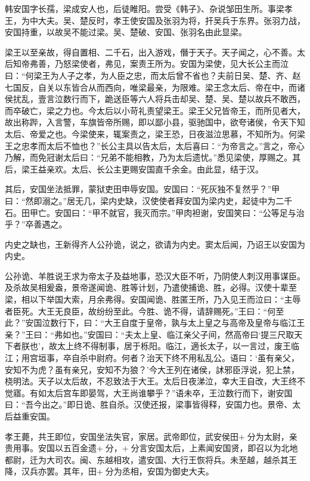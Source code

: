 \documentclass[12pt,UTF8]{ctexbook}
\begin{document}
韩安国字长孺，梁成安人也，后徒睢阳。尝受《韩子》、杂说邹田生所。事梁孝王，为中大夫。吴、楚反时，孝王使安国及张羽为将，扞吴兵于东界。张羽力战，安国持重，以故吴不能过梁。吴、楚破、安国、张羽名由此显梁。



梁王以至亲故，得自置相、二千石，出入游戏，僭于天子。天子闻之，心不善。太后知帝弗善，乃怒梁使者，弗见，案责王所为。安国为梁使，见大长公主而泣曰：“何梁王为人子之孝，为人臣之忠，而太后曾不省也？夫前日吴、楚、齐、赵七国反，自关以东皆合从而西向，唯梁最亲，为限难。梁王念太后、帝在中，而诸侯扰乱，壹言泣数行而下，跪送臣等六人将兵击却吴、楚、吴、楚以故兵不敢西，而卒破亡，梁之力也。今太后以小苛礼责望梁王。梁王父兄皆帝王，而所见者大，故出称跸，入言警，车旗皆帝所赐，即以鄙小县，驱驰国中，欲夸诸侯，令天下知太后、帝爱之也。今梁使来，辄案责之，梁王恐，日夜滋泣思慕，不知所为。何梁王之忠孝而太后不恤也？”长公主具以告太后，太后喜曰：“为帝言之。”言之，帝心乃解，而免冠谢太后曰：“兄弟不能相教，乃为太后遗忧。”悉见梁使，厚赐之。其后，梁王益亲欢。太后、长公主更赐安国直千余金。由此显，结于汉。



其后，安国坐法抵罪，蒙狱吏田申辱安国。安国曰：“死灰独不复然乎？”甲曰：“然即溺之。”居无几，梁内史缺，汉使使者拜安国为梁内史，起徒中为二千石。田甲亡。安国曰：“甲不就官，我灭而宗。”甲肉袒谢，安国笑曰：“公等足与治乎？”卒善遇之。



内史之缺也，王新得齐人公孙诡，说之，欲请为内史。窦太后闻，乃诏王以安国为内史。



公孙诡、羊胜说王求为帝太子及益地事，恐汉大臣不听，乃阴使人刺汉用事谋臣。及杀故吴相爰盎，景帝遂闻诡、胜等计划，乃遣使捕诡、胜，必得。汉使十辈至梁，相以下举国大索，月余弗得。安国闻诡、胜匿王所，乃入见王而泣曰：“主辱者臣死。大王无良臣，故纷纷至此。今胜、诡不得，请辞赐死。”王曰：“何至此？”安国泣数行下，曰：“大王自度于皇帝，孰与太上皇之与高帝及皇帝与临江王亲？”王曰：“弗如也。”安国曰：“夫太上皇、临江亲父子间，然高帝曰‘提三尺取天下者朕也’，故太上终不得制事，居于栎阳。临江，適长太子，以一言过，废王临江；用宫垣事，卒自杀中尉府。何者？治天下终不用私乱公。语曰：‘虽有亲父，安知不为虎？虽有亲兄，安知不为狼？’今大王列在诸侯，訹邪臣浮说，犯上禁，桡明法。天子以太后故，不忍致法于大王。太后日夜涕泣，幸大王自改，大王终不觉寤。有如太后宫车即晏驾，大王尚谁攀乎？”语未卒，王泣数行而下，谢安国曰：“吾今出之。”即日诡、胜自杀。汉使还报，梁事皆得释，安国力也。景帝、太后益重安国。



孝王薨，共王即位，安国坐法失官，家居。武帝即位，武安侯田+分为太尉，亲贵用事。安国以五百金遗+分，+分言安国太后，上素闻安国贤，即召以为北地都尉，迁为大司农。闽、东越相攻，遣安国、大行王恢将兵。未至越，越杀其王降，汉兵亦罢。其年，田+分为丞相，安国为御史大夫。
\end{document}
